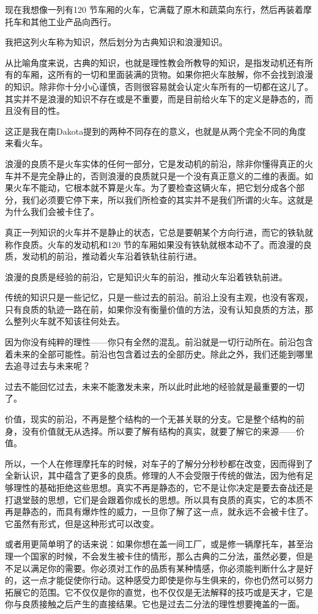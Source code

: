 \documentclass[UTF8]{article}
\begin{document}
\par 现在我想像一列有120 节车厢的火车，它满载了原木和蔬菜向东行，然后再装着摩托车和其他工业产品向西行。
\par 我把这列火车称为知识，然后划分为古典知识和浪漫知识。
\par 从比喻角度来说，古典的知识，也就是理性教会所教导的知识，是指发动机还有所有的车厢，这所有的一切和里面装满的货物。如果你把火车肢解，你不会找到浪漫的知识。除非你十分小心谨慎，否则很容易就会认定火车所有的一切都在这儿了。其实并不是浪漫的知识不存在或是不重要，而是目前给火车下的定义是静态的，而且没有目的性。
\par 这正是我在南Dakota提到的两种不同存在的意义，也就是从两个完全不同的角度来看火车。
\par 浪漫的良质不是火车实体的任何一部分，它是发动机的前沿，除非你懂得真正的火车并不是完全静止的，否则浪漫的良质就只是一个没有真正意义的二维的表面。如果火车不能动，它根本就不算是火车。为了要检查这辆火车，把它划分成各个部分，我们必须要它停下来，所以我们所检查的其实并不是我们所谓的火车。这就是为什么我们会被卡住了。
\par 真正一列知识的火车并不是静止的状态，它总是要朝某个方向行进，而它的铁轨就称作良质。火车的发动机和120 节的车厢如果没有铁轨就根本动不了。而浪漫的良质，发动机的前沿，推动着火车沿着铁轨往前行进。
\par 浪漫的良质是经验的前沿，它是知识火车的前沿，推动火车沿着铁轨前进。
\par 传统的知识只是一些记忆，只是一些过去的前沿。前沿上没有主观，也没有客观，只有良质的轨迹一路在前，如果你没有衡量价值的方法，没有认知良质的方法，那么整列火车就不知该往何处去。
\par 因为你没有纯粹的理性——你只有全然的混乱。前沿就是一切行动所在。前沿包含着未来的全部可能性。前沿也包含着过去的全部历史。除此之外，我们还能到哪里去追寻过去与未来呢？
\par 过去不能回忆过去，未来不能激发未来，所以此时此地的经验就是最重要的一切了。
\par 价值，现实的前沿，不再是整个结构的一个无甚关联的分支。它是整个结构的前身，没有价值就无从选择。所以要了解有结构的真实，就要了解它的来源——价值。
\par 所以，一个人在修理摩托车的时候，对车子的了解分分秒秒都在改变，因而得到了全新认识，其中蕴含了更多的良质。修理的人不会受限于传统的做法，因为他有足够理性的基础拒绝这些思想。真实不再是静态的，它不是让你决定是要去奋战还是打退堂鼓的思想，它们是会跟着你成长的思想。所以具有良质的真实，它的本质不再是静态的，而具有爆炸性的威力，一旦你了解了这一点，就永远不会被卡住了。它虽然有形式，但是这种形式可以改变。
\par 或者用更简单明了的话来说：如果你想在盖一间工厂，或是修一辆摩托车，甚至治理一个国家的时候，不会发生被卡住的情形，那么古典的二分法，虽然必要，但是不足以满足你的需要。你必须对工作的品质有某种情感，你必须能判断什么才是好的，这一点才能促使你行动。这种感受力即使是你与生俱来的，你也仍然可以努力拓展它的范围。它不仅仅是你的直觉，也不仅仅是无法解释的技巧或是天才，它是你与良质接触之后产生的直接结果。它也是过去二分法的理性想要掩盖的一面。
\end{document}
